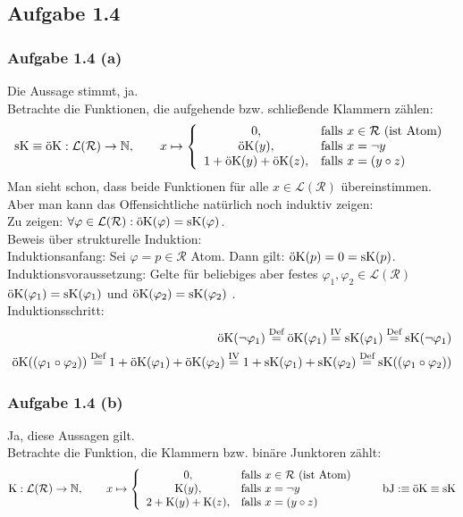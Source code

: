 \subsection{Aufgabe 1.4}
\subsubsection{Aufgabe 1.4 (a)}
Die Aussage stimmt, ja.\\
Betrachte die Funktionen, die aufgehende bzw. schließende Klammern zählen:
\begin{align*}
	\sk\equiv\ok:\mathcal{L}(\mathcal{R})\to\N,\qquad
	x\mapsto\left\lbrace\begin{array}{cl}
		0, & \falls x\in\mathcal{R}\text{ (ist Atom)}\\
		\ok(y), & \falls x=\neg y\\
		1+\ok(y)+\ok(z), & \falls x=(y\circ z)
	\end{array}\right.
\end{align*}
Man sieht schon, dass beide Funktionen für alle $x\in\mathcal{L}(\mathcal{R})$ übereinstimmen. 
Aber man kann das Offensichtliche natürlich noch induktiv zeigen:\\

Zu zeigen: $\forall\varphi\in\mathcal{L}(\mathcal{R}):\ok(\varphi)=\sk(\varphi)$.\\
Beweis über strukturelle Induktion:\\
Induktionsanfang: Sei $\varphi=p\in\mathcal{R}$ Atom. Dann gilt: $\ok(p)=0=\sk(p)$.\\
Induktionsvoraussetzung: Gelte für beliebiges aber festes $\varphi_1,\varphi_2\in\mathcal{L}(\mathcal{R})$\\ $\ok(\varphi_1)=\sk(\varphi_1)$ und $\ok(\varphi_2)=\sk(\varphi_2)$ .\\ 
Induktionsschritt:
\begin{align*}
	\ok(\neg \varphi_1)
	\stackeq{\text{Def}}\ok(\varphi_1)
	\stackeq{\text{IV}}\sk(\varphi_1)
	\stackeq{\text{Def}}\sk(\neg \varphi_1)\\
	\ok((\varphi_1\circ \varphi_2))
	\stackeq{\text{Def}}1+\ok(\varphi_1)+\ok(\varphi_2)
	\stackeq{\text{IV}}1+\sk(\varphi_1)+\sk(\varphi_2)
	\stackeq{\text{Def}}\sk((\varphi_1\circ \varphi_2))
\end{align*}

\subsubsection{Aufgabe 1.4 (b)}
Ja, diese Aussagen gilt.\\
Betrachte die Funktion, die Klammern bzw. binäre Junktoren zählt:
\begin{align*}
	\k:\mathcal{L}(\mathcal{R})\to\N,\qquad
		x\mapsto\left\lbrace\begin{array}{cl}
		0, & \falls x\in\mathcal{R}\text{ (ist Atom)}\\
		\k(y), & \falls x=\neg y\\
		2+\k(y)+\k(z), & \falls x=(y\circ z)
	\end{array}\right.\qquad \bj:\equiv \ok\equiv\sk
\end{align*}


